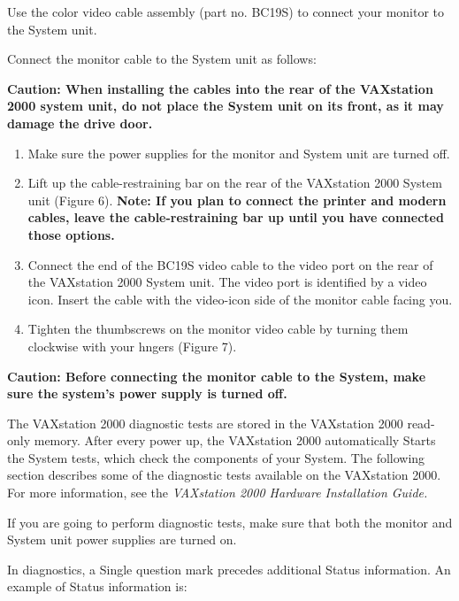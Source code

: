 \documentclass{dec}
\begin{document}

Use the color video cable assembly (part no. BC19S) to connect your monitor
to the System unit.

Connect the monitor cable to the System unit as follows:

\textbf{Caution: When installing the cables into the rear of the VAXstation 2000
system unit, do not place the System unit on its front, as it may damage
the drive door.}

\begin{enumerate}
\item Make sure the power supplies for the monitor and System unit are turned
off.
\item  Lift up the cable-restraining bar on the rear of the VAXstation 2000 System
unit (Figure 6).
\textbf{Note: If you plan to connect the printer and modern cables, leave the
cable-restraining bar up until you have connected those options.}
\item Connect the end of the BC19S video cable to the video port on the rear
of the VAXstation 2000 System unit.
 The video port is identified by a
video icon. Insert the cable with the video-icon side of the monitor cable
facing you.
\item Tighten the thumbscrews on the monitor video cable by turning them
clockwise with your hngers (Figure 7).
\end{enumerate}
\textbf{Caution: Before connecting the monitor cable to the System, make sure
the system's power supply is turned off.}


The VAXstation 2000 diagnostic tests are stored in the VAXstation 2000 read-
only memory. After every power up, the VAXstation 2000 automatically Starts
the System tests, which check the components of your System. The following
section describes some of the diagnostic tests available on the VAXstation
2000.
 For more information, see the \textit{VAXstation 2000 Hardware Installation
Guide.}

If you are going to perform diagnostic tests, make sure that both the monitor
and System unit power supplies are turned on.

In diagnostics, a Single question mark precedes additional Status information.
An example of Status information is:
\end{document}
